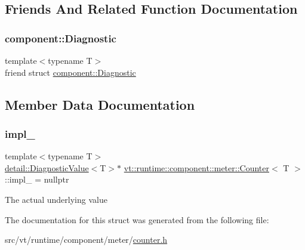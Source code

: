 \subsection{Friends And Related Function Documentation}
\mbox{\label{structvt_1_1runtime_1_1component_1_1meter_1_1_counter_a48f263de9dbf26c1fc7736031cca9613}} 
\subsubsection{\texorpdfstring{component\+::\+Diagnostic}{component::Diagnostic}}
{\footnotesize\ttfamily template$<$typename T$>$ \\
friend struct \hyperlink{structvt_1_1runtime_1_1component_1_1_diagnostic}{component\+::\+Diagnostic}\hspace{0.3cm}{\ttfamily [friend]}}



\subsection{Member Data Documentation}
\mbox{\label{structvt_1_1runtime_1_1component_1_1meter_1_1_counter_a2e2b0b2a78c95c3017a571bd76310eba}} 
\subsubsection{\texorpdfstring{impl\+\_\+}{impl\_}}
{\footnotesize\ttfamily template$<$typename T$>$ \\
\hyperlink{structvt_1_1runtime_1_1component_1_1detail_1_1_diagnostic_value}{detail\+::\+Diagnostic\+Value}$<$T$>$$\ast$ \hyperlink{structvt_1_1runtime_1_1component_1_1meter_1_1_counter}{vt\+::runtime\+::component\+::meter\+::\+Counter}$<$ T $>$\+::impl\+\_\+ = nullptr\hspace{0.3cm}{\ttfamily [private]}}

The actual underlying value 

The documentation for this struct was generated from the following file\+:\begin{DoxyCompactItemize}
\item 
src/vt/runtime/component/meter/\hyperlink{counter_8h}{counter.\+h}\end{DoxyCompactItemize}
